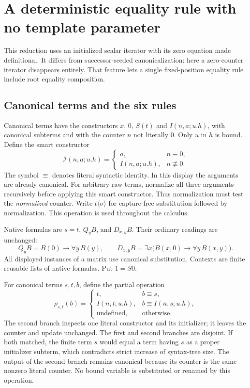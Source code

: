 
\section{A deterministic equality rule with no template parameter}
\label{seed:main}

This reduction uses an initialized scalar iterator with its zero equation
made definitional. It differs from successor-seeded canonicalization:
here a zero-counter iterator disappears entirely. That feature lets a
single fixed-position equality rule include root equality composition.

\subsection{Canonical terms and the six rules}

Canonical terms have the constructors $x$, $0$, $S(t)$ and
$I(n,a;u.h)$, with canonical subterms and with the counter $n$ not
literally $0$. Only $u$ in $h$ is bound. Define the smart constructor
\[
 \mathcal I(n,a;u.h)=
 \begin{cases}
 a,&n\equiv0,\\
 I(n,a;u.h),&n\not\equiv0.
 \end{cases}
\]
The symbol $\equiv$ denotes literal syntactic identity. In this display
the arguments are already canonical. For arbitrary raw terms, normalize
all three arguments recursively before applying this smart constructor.
Thus normalization must test the \emph{normalized} counter.
Write $t\langle\sigma\rangle$ for capture-free substitution followed by
normalization. This operation is used throughout the calculus.

Native formulas are $s=t$, $Q_y B$, and $D_{x,y}B$. Their ordinary
readings are unchanged:
\[
 Q_yB=B(0)\to\forall y\,B(y),\qquad
 D_{x,y}B=\exists x\bigl(B(x,0)\to\forall y\,B(x,y)\bigr).
\]
All displayed instances of a matrix use canonical substitution.
Contexts are finite reusable lists of native formulas. Put $1=S0$.

For canonical terms $s,t,b$, define the partial operation
\[
 \rho_{s,t}(b)=
 \begin{cases}
 t,&b\equiv s,\\
 I(n,t;u.h),&b\equiv I(n,s;u.h),\\
 \text{undefined},&\text{otherwise}.
 \end{cases}
 \tag{Seed replacement}\label{seed:rho}
\]
The second branch inspects one literal constructor and its initializer;
it leaves the counter and update unchanged. The first and second branches
are disjoint. If both matched, the finite term $s$ would equal a term
having $s$ as a proper initializer subterm, which contradicts strict
increase of syntax-tree size. The output of the second branch remains
canonical because its counter is the same nonzero literal counter.
No bound variable is substituted or renamed by this operation.


